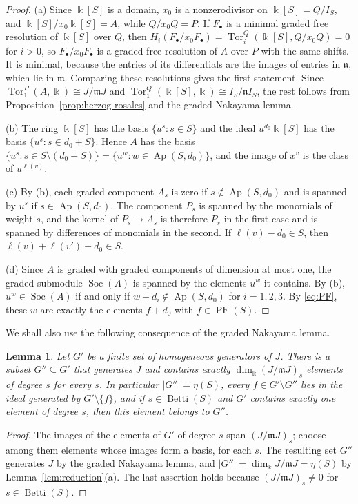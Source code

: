 \documentclass{amsart}
\newtheorem{lemma}[theorem]{Lemma}
\theoremstyle{definition}
\theoremstyle{remark}
\numberwithin{equation}{section}
\newcommand{\kk}{\Bbbk}
\newcommand{\fm}{\mathfrak{m}}
\newcommand{\fn}{\mathfrak{n}}
\newcommand{\Ap}{\operatorname{Ap}}
\DeclareMathOperator{\PF}{PF}
\DeclareMathOperator{\Betti}{Betti}
\DeclareMathOperator{\Soc}{Soc}
\DeclareMathOperator{\Tor}{Tor}
\newcommand{\wt}{\ell}
\newcommand{\Apd}{\Ap(S,d_0)}
\begin{document}
\begin{proof}
(a) Since $\kk[S]$ is a domain, $x_0$ is a nonzerodivisor on $\kk[S]=Q/I_S$, and $\kk[S]/x_0\kk[S]=A$, while $Q/x_0Q=P$. If $F_\bullet$ is a minimal graded free resolution of $\kk[S]$ over $Q$, then $H_i(F_\bullet/x_0F_\bullet)=\Tor_i^Q(\kk[S],Q/x_0Q)=0$ for $i>0$, so $F_\bullet/x_0F_\bullet$ is a graded free resolution of $A$ over $P$ with the same shifts. It is minimal, because the entries of its differentials are the images of entries in $\fn$, which lie in $\fm$. Comparing these resolutions gives the first statement. Since $\Tor_1^P(A,\kk)\cong J/\fm J$ and $\Tor_1^Q(\kk[S],\kk)\cong I_S/\fn I_S$, the rest follows from Proposition~\ref{prop:herzog-rosales} and the graded Nakayama lemma.

(b) The ring $\kk[S]$ has the basis $\{u^s : s\in S\}$ and the ideal $u^{d_0}\kk[S]$ has the basis $\{u^s : s\in d_0+S\}$. Hence $A$ has the basis $\{u^s : s\in S\setminus(d_0+S)\}=\{u^w : w\in\Apd\}$, and the image of $x^v$ is the class of $u^{\wt(v)}$.

(c) By (b), each graded component $A_s$ is zero if $s\notin\Apd$ and is spanned by $u^s$ if $s\in\Apd$. The component $P_s$ is spanned by the monomials of weight $s$, and the kernel of $P_s\to A_s$ is therefore $P_s$ in the first case and is spanned by differences of monomials in the second. If $\wt(v)-d_0\in S$, then $\wt(v)+\wt(v')-d_0\in S$.

(d) Since $A$ is graded with graded components of dimension at most one, the graded submodule $\Soc(A)$ is spanned by the elements $u^w$ it contains. By (b), $u^w\in\Soc(A)$ if and only if $w+d_i\notin\Apd$ for $i=1,2,3$. By \eqref{eq:PF}, these $w$ are exactly the elements $f+d_0$ with $f\in\PF(S)$.
\end{proof}

We shall also use the following consequence of the graded Nakayama lemma.

\begin{lemma}\label{lem:nakayama}
Let $G'$ be a finite set of homogeneous generators of $J$. There is a subset $G''\subseteq G'$ that generates $J$ and contains exactly $\dim_\kk(J/\fm J)_s$ elements of degree $s$ for every $s$. In particular $|G''|=\eta(S)$, every $f\in G'\setminus G''$ lies in the ideal generated by $G'\setminus\{f\}$, and if $s\in\Betti(S)$ and $G'$ contains exactly one element of degree $s$, then this element belongs to $G''$.
\end{lemma}

\begin{proof}
The images of the elements of $G'$ of degree $s$ span $(J/\fm J)_s$; choose among them elements whose images form a basis, for each $s$. The resulting set $G''$ generates $J$ by the graded Nakayama lemma, and $|G''|=\dim_\kk J/\fm J=\eta(S)$ by Lemma~\ref{lem:reduction}(a). The last assertion holds because $(J/\fm J)_s\neq0$ for $s\in\Betti(S)$.
\end{proof}
\end{document}
